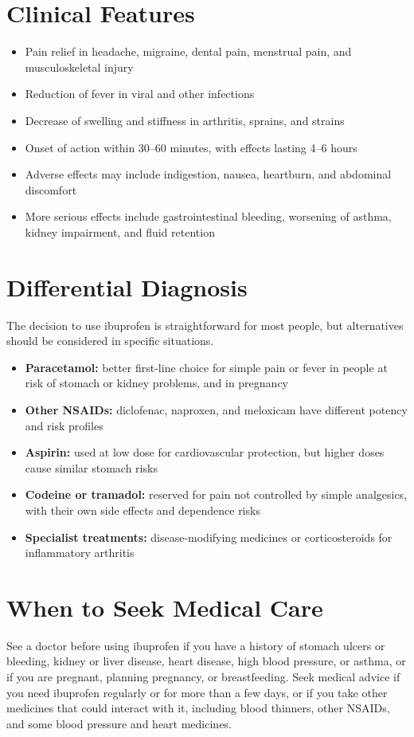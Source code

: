 \section*{Clinical Features}
\begin{itemize}
    \item Pain relief in headache, migraine, dental pain, menstrual pain, and musculoskeletal injury
    \item Reduction of fever in viral and other infections
    \item Decrease of swelling and stiffness in arthritis, sprains, and strains
    \item Onset of action within 30--60 minutes, with effects lasting 4--6 hours
    \item Adverse effects may include indigestion, nausea, heartburn, and abdominal discomfort
    \item More serious effects include gastrointestinal bleeding, worsening of asthma, kidney impairment, and fluid retention
\end{itemize}

\section*{Differential Diagnosis}
The decision to use ibuprofen is straightforward for most people, but alternatives should be considered in specific situations.
\begin{itemize}
    \item \textbf{Paracetamol:} better first-line choice for simple pain or fever in people at risk of stomach or kidney problems, and in pregnancy
    \item \textbf{Other NSAIDs:} diclofenac, naproxen, and meloxicam have different potency and risk profiles
    \item \textbf{Aspirin:} used at low dose for cardiovascular protection, but higher doses cause similar stomach risks
    \item \textbf{Codeine or tramadol:} reserved for pain not controlled by simple analgesics, with their own side effects and dependence risks
    \item \textbf{Specialist treatments:} disease-modifying medicines or corticosteroids for inflammatory arthritis
\end{itemize}

\section*{When to Seek Medical Care}
See a doctor before using ibuprofen if you have a history of stomach ulcers or bleeding, kidney or liver disease, heart disease, high blood pressure, or asthma, or if you are pregnant, planning pregnancy, or breastfeeding. Seek medical advice if you need ibuprofen regularly or for more than a few days, or if you take other medicines that could interact with it, including blood thinners, other NSAIDs, and some blood pressure and heart medicines.

